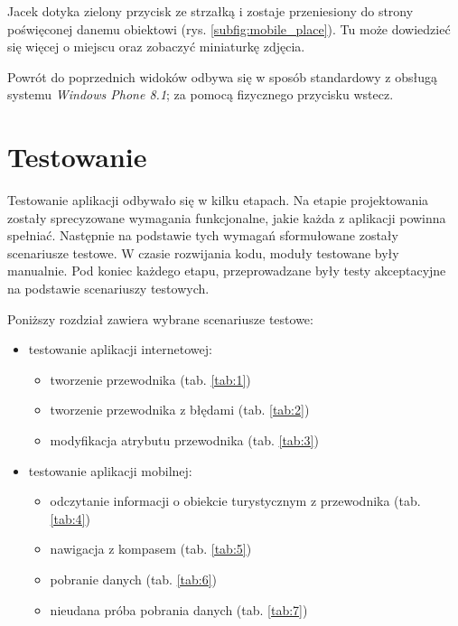 \documentclass[a4paper]{book}
\begin{document}
		Jacek dotyka zielony przycisk ze strzałką i zostaje przeniesiony do strony poświęconej danemu obiektowi (rys. \ref{subfig:mobile_place}). Tu może dowiedzieć się więcej o miejscu oraz zobaczyć miniaturkę zdjęcia.
		
		Powrót do poprzednich widoków odbywa się w sposób standardowy z obsługą systemu \emph{Windows Phone 8.1}; za pomocą fizycznego przycisku wstecz. 		 
	
	\chapter{Testowanie}
	\label{id:cha:testowanie}
	
	Testowanie aplikacji odbywało się w kilku etapach. Na etapie projektowania zostały sprecyzowane wymagania funkcjonalne, jakie każda z aplikacji powinna spełniać. Następnie na podstawie tych wymagań sformułowane zostały scenariusze testowe. W czasie rozwijania kodu, moduły testowane były manualnie. Pod koniec każdego etapu, przeprowadzane były testy akceptacyjne na podstawie scenariuszy testowych. 
	 
	Poniższy rozdział zawiera wybrane scenariusze testowe:

	\begin{itemize}
	\item testowanie aplikacji internetowej:
	   \begin{itemize}
	   \item tworzenie przewodnika (tab. \ref{tab:1})
	   \item tworzenie przewodnika z błędami (tab. \ref{tab:2})
	   \item modyfikacja atrybutu przewodnika (tab. \ref{tab:3})
	   \end{itemize}
	\item testowanie aplikacji mobilnej:
	   \begin{itemize}
	   \item odczytanie informacji o obiekcie turystycznym z przewodnika (tab. \ref{tab:4})
	   \item nawigacja z kompasem  (tab. \ref{tab:5})
	   \item pobranie danych  (tab. \ref{tab:6})
	   \item nieudana próba pobrania danych  (tab. \ref{tab:7})
	   \end{itemize}
	\end{itemize}
	
	\setlength{\tabcolsep}{6pt}
	\renewcommand{\arraystretch}{1.5}
				
\end{document}
